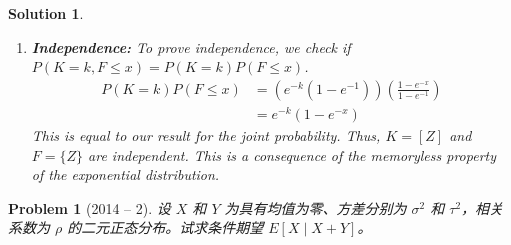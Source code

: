 \documentclass[12pt]{amsart}
\newtheorem{problem}{Problem}
\newtheorem*{solution}{Solution}
\begin{document}
\begin{solution}
\begin{enumerate}
    \item \textbf{Independence:} To prove independence, we check if $P(K=k, F \leq x) = P(K=k)P(F \leq x)$.
    \begin{align*}
        P(K=k)P(F \leq x) &= \left( e^{-k}(1-e^{-1}) \right) \left( \frac{1-e^{-x}}{1-e^{-1}} \right) \\
        &= e^{-k}(1-e^{-x})
    \end{align*}
    This is equal to our result for the joint probability. Thus, $K=[Z]$ and $F=\{Z\}$ are independent. This is a consequence of the memoryless property of the exponential distribution.
\end{enumerate}
\end{solution}

\begin{problem}[2014 -- 2]
设 $X$ 和 $Y$ 为具有均值为零、方差分别为 $\sigma^2$ 和 $\tau^2$，相关系数为 $\rho$ 的二元正态分布。试求条件期望 $E[X \mid X+Y]$。
\end{problem}
\end{document}
